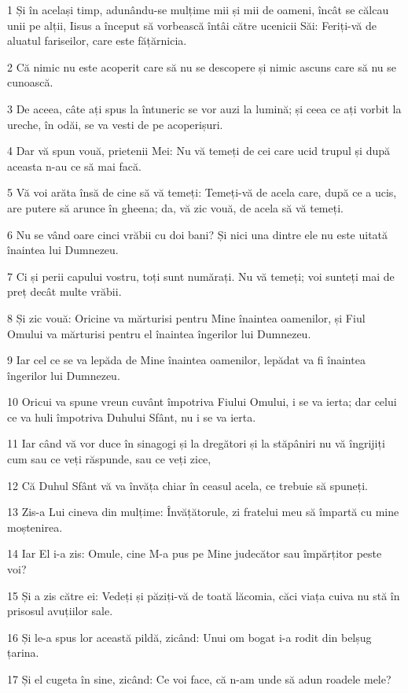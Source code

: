 \par 1 Și în același timp, adunându-se mulțime mii și mii de oameni, încât se călcau unii pe alții, Iisus a început să vorbească întâi către ucenicii Săi: Feriți-vă de aluatul fariseilor, care este fățărnicia.
\par 2 Că nimic nu este acoperit care să nu se descopere și nimic ascuns care să nu se cunoască.
\par 3 De aceea, câte ați spus la întuneric se vor auzi la lumină; și ceea ce ați vorbit la ureche, în odăi, se va vesti de pe acoperișuri.
\par 4 Dar vă spun vouă, prietenii Mei: Nu vă temeți de cei care ucid trupul și după aceasta n-au ce să mai facă.
\par 5 Vă voi arăta însă de cine să vă temeți: Temeți-vă de acela care, după ce a ucis, are putere să arunce în gheena; da, vă zic vouă, de acela să vă temeți.
\par 6 Nu se vând oare cinci vrăbii cu doi bani? Și nici una dintre ele nu este uitată înaintea lui Dumnezeu.
\par 7 Ci și perii capului vostru, toți sunt numărați. Nu vă temeți; voi sunteți mai de preț decât multe vrăbii.
\par 8 Și zic vouă: Oricine va mărturisi pentru Mine înaintea oamenilor, și Fiul Omului va mărturisi pentru el înaintea îngerilor lui Dumnezeu.
\par 9 Iar cel ce se va lepăda de Mine înaintea oamenilor, lepădat va fi înaintea îngerilor lui Dumnezeu.
\par 10 Oricui va spune vreun cuvânt împotriva Fiului Omului, i se va ierta; dar celui ce va huli împotriva Duhului Sfânt, nu i se va ierta.
\par 11 Iar când vă vor duce în sinagogi și la dregători și la stăpâniri nu vă îngrijiți cum sau ce veți răspunde, sau ce veți zice,
\par 12 Că Duhul Sfânt vă va învăța chiar în ceasul acela, ce trebuie să spuneți.
\par 13 Zis-a Lui cineva din mulțime: Învățătorule, zi fratelui meu să împartă cu mine moștenirea.
\par 14 Iar El i-a zis: Omule, cine M-a pus pe Mine judecător sau împărțitor peste voi?
\par 15 Și a zis către ei: Vedeți și păziți-vă de toată lăcomia, căci viața cuiva nu stă în prisosul avuțiilor sale.
\par 16 Și le-a spus lor această pildă, zicând: Unui om bogat i-a rodit din belșug țarina.
\par 17 Și el cugeta în sine, zicând: Ce voi face, că n-am unde să adun roadele mele?
